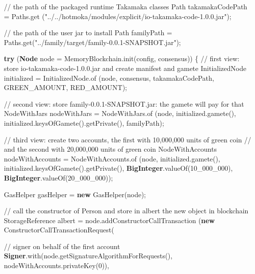 \documentclass[a4paper,]{book}
\newenvironment{Shaded}{\begin{snugshade}}{\end{snugshade}}
\newcommand{\BuiltInTok}[1]{\textcolor[rgb]{0.39,0.29,0.61}{\textbf{#1}}}
\newcommand{\CommentTok}[1]{\textcolor[rgb]{0.54,0.53,0.53}{#1}}
\newcommand{\DecValTok}[1]{\textcolor[rgb]{0.69,0.50,0.00}{#1}}
\newcommand{\FunctionTok}[1]{\textcolor[rgb]{0.39,0.29,0.61}{#1}}
\newcommand{\KeywordTok}[1]{\textcolor[rgb]{0.12,0.11,0.11}{\textbf{#1}}}
\newcommand{\NormalTok}[1]{\textcolor[rgb]{0.12,0.11,0.11}{#1}}
\newcommand{\StringTok}[1]{\textcolor[rgb]{0.75,0.01,0.01}{#1}}
\renewenvironment{Shaded}{\begin{snugshade}\small}{\end{snugshade}}
\begin{document}
{\begin{Shaded}
\begin{Highlighting}[]
    \CommentTok{// the path of the packaged runtime Takamaka classes}
\NormalTok{    Path takamakaCodePath = Paths.}\FunctionTok{get}
\NormalTok{      (}\StringTok{"../../hotmoka/modules/explicit/io-takamaka-code-1.0.0.jar"}\NormalTok{);}

    \CommentTok{// the path of the user jar to install}
\NormalTok{    Path familyPath = Paths.}\FunctionTok{get}\NormalTok{(}\StringTok{"../family/target/family-0.0.1-SNAPSHOT.jar"}\NormalTok{);}

    \KeywordTok{try}\NormalTok{ (}\BuiltInTok{Node}\NormalTok{ node = MemoryBlockchain.}\FunctionTok{init}\NormalTok{(config, consensus)) \{}
      \CommentTok{// first view: store io-takamaka-code-1.0.0.jar and create manifest and gamete}
\NormalTok{      InitializedNode initialized = InitializedNode.}\FunctionTok{of}
\NormalTok{        (node, consensus, takamakaCodePath, GREEN_AMOUNT, RED_AMOUNT);}

      \CommentTok{// second view: store family-0.0.1-SNAPSHOT.jar: the gamete will pay for that}
\NormalTok{      NodeWithJars nodeWithJars = NodeWithJars.}\FunctionTok{of}
\NormalTok{        (node, initialized.}\FunctionTok{gamete}\NormalTok{(), initialized.}\FunctionTok{keysOfGamete}\NormalTok{().}\FunctionTok{getPrivate}\NormalTok{(),}
\NormalTok{        familyPath);}

      \CommentTok{// third view: create two accounts, the first with 10,000,000 units of green coin}
      \CommentTok{// and the second with 20,000,000 units of green coin}
\NormalTok{      NodeWithAccounts nodeWithAccounts = NodeWithAccounts.}\FunctionTok{of}
\NormalTok{        (node, initialized.}\FunctionTok{gamete}\NormalTok{(), initialized.}\FunctionTok{keysOfGamete}\NormalTok{().}\FunctionTok{getPrivate}\NormalTok{(),}
        \BuiltInTok{BigInteger}\NormalTok{.}\FunctionTok{valueOf}\NormalTok{(}\DecValTok{10_000_000}\NormalTok{), }\BuiltInTok{BigInteger}\NormalTok{.}\FunctionTok{valueOf}\NormalTok{(}\DecValTok{20_000_000}\NormalTok{));}

\NormalTok{      GasHelper gasHelper = }\KeywordTok{new} \FunctionTok{GasHelper}\NormalTok{(node);}

      \CommentTok{// call the constructor of Person and store in albert the new object in blockchain}
\NormalTok{      StorageReference albert = node.}\FunctionTok{addConstructorCallTransaction}
\NormalTok{        (}\KeywordTok{new} \FunctionTok{ConstructorCallTransactionRequest}\NormalTok{(}

          \CommentTok{// signer on behalf of the first account}
          \BuiltInTok{Signer}\NormalTok{.}\FunctionTok{with}\NormalTok{(node.}\FunctionTok{getSignatureAlgorithmForRequests}\NormalTok{(),}
\NormalTok{            nodeWithAccounts.}\FunctionTok{privateKey}\NormalTok{(}\DecValTok{0}\NormalTok{)),}


\end{Highlighting}
\end{Shaded}}
\end{document}
